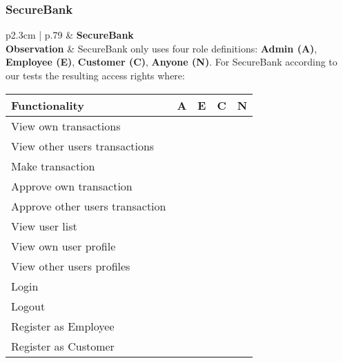 \subsubsection{SecureBank}
\begin{longtable}[l]{p{2.3cm} | p{.79\linewidth}}
    \hline
    & \textbf{SecureBank} \\ 
    \hline
    \textbf{Observation} &
        SecureBank only uses four role definitions: \textbf{Admin (A)}, \textbf{Employee (E)}, \textbf{Customer (C)}, \textbf{Anyone (N)}.
        For SecureBank according to our tests the resulting access rights where:
        \begin{center}
            \begin{tabular}{ | l | l | l | l | l |}
            \hline
            \textbf{Functionality}          & \textbf{A} & \textbf{E} & \textbf{C} & \textbf{N} \\ \hline
            View own transactions           & \xmark    & \xmark    & \cmark    & \xmark \\ \hline
            View other users transactions   & \cmark    & \cmark    & \xmark    & \xmark \\ \hline
            Make transaction                & \xmark    & \xmark    & \cmark    & \xmark \\ \hline
            Approve own transaction         & \xmark    & \xmark    & \xmark    & \xmark \\ \hline
            Approve other users transaction & \cmark    & \cmark    & \xmark    & \xmark \\ \hline
            View user list                  & \cmark    & \cmark    & \xmark    & \xmark \\ \hline
            View own user profile           & \cmark    & \cmark    & \cmark    & \xmark \\ \hline
            View other users profiles       & \cmark    & \cmark    & \xmark    & \xmark \\ \hline
            Login                           & \cmark    & \cmark    & \cmark    & \xmark \\ \hline
            Logout                          & \cmark    & \cmark    & \cmark    & \xmark \\ \hline
            Register as Employee            & \xmark    & \xmark    & \xmark    & \cmark \\ \hline
            Register as Customer            & \xmark    & \xmark    & \xmark    & \cmark \\ \hline

\end{tabular}
\end{center}
\end{longtable}
